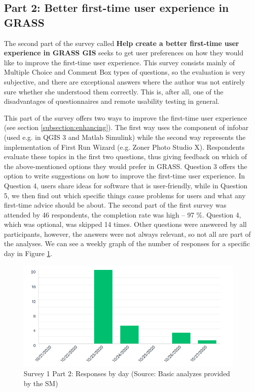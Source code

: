 \documentclass[a4paper,10pt,twoside]{article}
\begin{document}
\newpage
\vspace*{-1cm}
\subsection{Part 2: Better first-time user experience in GRASS}

\noindent The second part of the survey called \textbf{Help create a
  better first-time user experience in GRASS GIS} seeks to get user
preferences on how they would like to improve the first-time user
experience. This survey consists mainly of Multiple Choice and Comment
Box types of questions, so the evaluation is very subjective, and there
are exceptional answers where the author was not entirely sure
whether she understood them correctly. This is, after all, one of the
disadvantages of questionnaires and remote usability testing in
general.

This part of the survey offers two ways to improve the first-time user
experience (see section \ref{subsection:enhancing}). The first way 
uses the component of  infobar (used e.g. in QGIS 3 and Matlab Simulink) while the 
second way represents the implementation of First Run Wizard
(e.g. Zoner Photo Studio X). Respondents
evaluate these topics in the first two questions, thus giving feedback
on which of the above-mentioned options they would prefer in GRASS. Question 3
offers the option to write suggestions on how to improve
the first-time user experience. In Question 4, users share ideas for
software that is user-friendly, while in Question 5, we then find out
which specific things cause problems for users and what any first-time
advice should be about. The second part of the first survey was
attended by 46 respondents, the completion rate was high -- 97
\%. Question 4, which was optional, was skipped 14 times. Other
questions were answered by all participants, however, the answers were
not always relevant, so not all are part of the analyses. We can see a
weekly graph of the number of responses for a specific day in Figure
\ref{fig:survey1_part2_insight2}.

\vspace{0.3cm}
\begin{figure}[hbt!] 
\begin{center}
\includegraphics[width=15cm]{../surveys/analyzed_data/survey1_part2_insight2.png} 
\caption[Survey 1 Part 2: Responses by day]{Survey 1 Part 2: Responses by day (Source: Basic analyzes provided by the SM)}
\label{fig:survey1_part2_insight2}
\end{center}
\end{figure}
\end{document}
